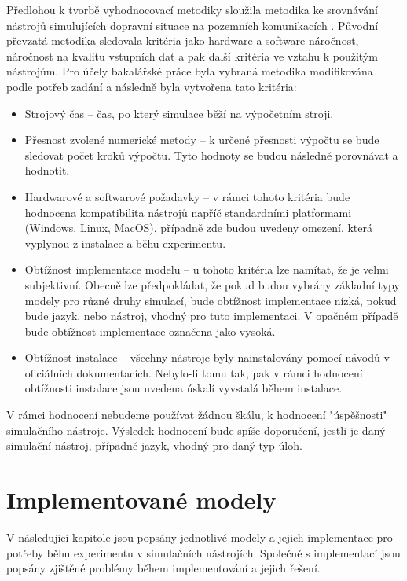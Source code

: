 Předlohou k tvorbě vyhodnocovací metodiky sloužila metodika ke srovnávání nástrojů simulujících dopravní situace na pozemních komunikacích \cite{jones2004traffic}. Původní převzatá metodika sledovala kritéria jako hardware a software náročnost, náročnost na kvalitu vstupních dat a pak další kritéria ve vztahu k použitým nástrojům. Pro účely bakalářské práce byla vybraná metodika modifikována podle potřeb zadání a následně byla vytvořena tato kritéria:
\begin{itemize}
    \item Strojový čas -- čas, po který simulace běží na výpočetním stroji.
    \item Přesnost zvolené numerické metody -- k určené přesnosti výpočtu se bude sledovat počet kroků výpočtu. Tyto hodnoty se budou následně porovnávat a hodnotit.
    \item Hardwarové a softwarové požadavky -- v rámci tohoto kritéria bude hodnocena kompatibilita nástrojů napříč standardními platformami (Windows, Linux, MacOS), případně zde budou uvedeny omezení, která vyplynou z instalace a běhu experimentu.
    \item Obtížnost implementace modelu -- u tohoto kritéria lze namítat, že je velmi subjektivní. Obecně lze předpokládat, že pokud budou vybrány základní typy modely pro různé druhy simulací, bude obtížnost implementace nízká, pokud bude jazyk, nebo nástroj, vhodný pro tuto implementaci. V opačném případě bude obtížnost implementace označena jako vysoká.
    \item Obtížnost instalace -- všechny nástroje byly nainstalovány pomocí návodů v oficiálních dokumentacích. Nebylo-li tomu tak, pak v rámci hodnocení obtížnosti instalace jsou uvedena úskalí vyvstalá během instalace.
\end{itemize}

V rámci hodnocení nebudeme používat žádnou škálu, k hodnocení "úspěšnosti" simulačního nástroje. Výsledek hodnocení bude spíše doporučení, jestli je daný simulační nástroj, případně jazyk, vhodný pro daný typ úloh.


\section{Implementované modely}
\label{implementace}
V následující kapitole jsou popsány jednotlivé modely a jejich implementace pro potřeby běhu experimentu v simulačních nástrojích. Společně s implementací jsou popsány zjištěné problémy během implementování a jejich řešení. 

